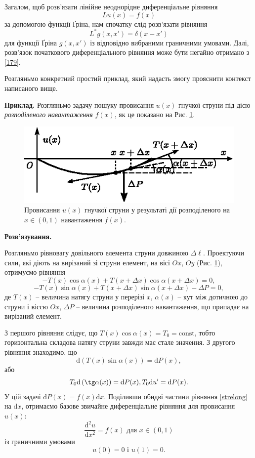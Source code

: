\documentclass[14pt,twoside]{extreport}
\theoremstyle{mystyle}
\numberwithin{equation}{chapter}
\begin{document}
Загалом, щоб розв'язати лінійне неоднорідне диференціальне рівняння
$$
L u(x)=f(x)
$$
за допомогою функції Ґріна, нам спочатку слід розв'язати рівняння
$$
L^{*}g(x, x')=\delta(x-x')
$$
для функції Ґріна $g(x, x')$ із відповідно вибраними граничними умовами. Далі, розв'язок початкового диференціального рівняння може бути негайно отримано з \eqref{179}.

Розгляньмо конкретний простий приклад, який надасть змогу прояснити контекст написаного вище.

\textbf{Приклад.} Розгляньмо задачу пошуку провисання $u(x)$ гнучкої струни під дією \emph{розподіленого навантаження} $f(x)$, як це показано на Рис. \ref{figstring}.

\begin{figure}[ht]\centering
	\includegraphics[scale=1]{string1.eps}
	\caption{Провисання $u(x)$ гнучкої струни у результаті дії розподіленого на $x\in(0, 1)$ навантаження $f(x)$.}\label{figstring}
\end{figure}

\textbf{Розв'язування.}

Розгляньмо рівновагу довільного елемента струни довжиною $\Delta \ell$. Проектуючи сили, які діють на вирізаний зі струни елемент, на вісі $Ox$, $Oy$ (Рис. \ref{figstring}), отримуємо рівняння
\[
-T(x)\cos \alpha(x) + T(x + \Delta x)\cos \alpha(x + \Delta x) = 0,
\]
\[
-T(x) \sin\alpha(x) + T(x + \Delta x) \sin\alpha(x + \Delta x) - \Delta P = 0,
\]
де $T(x)$ -- величина натягу струни у перерізі $x$, $\alpha(x)$ -- кут між дотичною до струни і віссю $Ox$, $\Delta P$ -- величина розподіленого навантаження, що припадає на вирізаний елемент.

З першого рівняння слідує, що $T(x) \cos \alpha(x) = T_0 = \textrm{const}$, тобто горизонтальна складова натягу струни завжди має стале значення. З другого рівняння знаходимо, що
\[
\mathrm{d}\left(T(x) \sin\alpha(x)\right) = \mathrm{d}P(x),
\]
або
\begin{equation}\label{strelong}
T_0\mathrm{d}\left(\tg \alpha(x)\right) = \mathrm{d} P(x), T_0 \mathrm{d}u' = \mathrm{d}P(x).
\end{equation}
У цій задачі $\mathrm{d}P(x) = f(x) \mathrm{d}x$. Поділивши обидві частини рівняння \eqref{strelong} на $\mathrm{d}x$, отримаємо базове звичайне диференціальне рівняння для провисання $u(x)$:
\begin{equation}\label{1710}
\displaystyle \frac{\mathrm{d}^{2}u}{\mathrm{d}x^{2}}=f(x)\textrm{ для }x\in(0,1)
\end{equation}
із граничними умовами
\begin{equation}\label{1711}
u(0)=0\textrm{ і }u(1)=0.
\end{equation}
\end{document}
